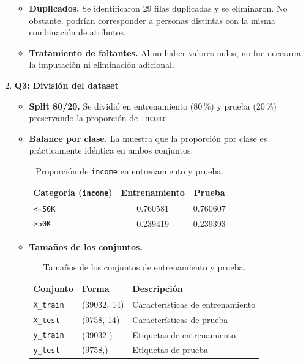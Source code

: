 \documentclass[12pt,a4paper]{article}
\begin{document}
\begin{enumerate}
\begin{itemize}
      \item \textbf{Duplicados.} Se identificaron 29 filas duplicadas y se eliminaron. No obstante, podrían corresponder a personas 
      distintas con la misma combinación de atributos.

      \item \textbf{Tratamiento de faltantes.} Al no haber valores nulos, no fue necesaria la imputación ni eliminación adicional.
    \end{itemize}

    \item \textbf{Q3: División del dataset}
    \begin{itemize}
      \item \textbf{Split 80/20.} Se dividió en entrenamiento (80\,\%) y prueba (20\,\%) preservando la proporción de \texttt{income}.
      \item \textbf{Balance por clase.} La  muestra que la proporción por clase es prácticamente idéntica en ambos conjuntos.

      \begin{table}[H]
        \centering
        \begin{tabular}{@{}lS[table-format=1.6]S[table-format=1.6]@{}}
          \toprule
          \textbf{Categoría (\texttt{income})} & \textbf{Entrenamiento} & \textbf{Prueba} \\
          \midrule
          \texttt{<=50K} & 0.760581 & 0.760607 \\
          \texttt{>50K}  & 0.239419 & 0.239393 \\
          \bottomrule
        \end{tabular}
        \caption{Proporción de \texttt{income} en entrenamiento y prueba.}
        \label{tab:income_proportion}
      \end{table}

      \item \textbf{Tamaños de los conjuntos.}
      \begin{table}[H]
        \centering
        \begin{tabular}{@{}lll@{}}
          \toprule
          \textbf{Conjunto} & \textbf{Forma} & \textbf{Descripción} \\
          \midrule
          \texttt{X\_train} & (39032, 14) & Características de entrenamiento \\
          \texttt{X\_test}  & (9758, 14)  & Características de prueba \\
          \texttt{y\_train} & (39032,)    & Etiquetas de entrenamiento \\
          \texttt{y\_test}  & (9758,)     & Etiquetas de prueba \\
          \bottomrule
        \end{tabular}
        \caption{Tamaños de los conjuntos de entrenamiento y prueba.}
        \label{tab:train_test_shapes}
      \end{table}
    \end{itemize}


\end{enumerate}
\end{document}
